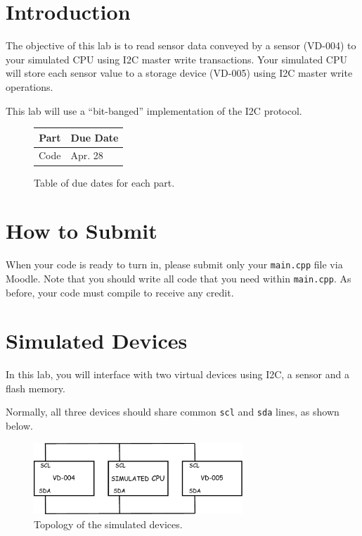 \documentclass{article}
\begin{document}
\section{Introduction}

The objective of this lab is to read sensor data conveyed by a sensor
(VD-004) to your simulated CPU using I2C master write transactions.
Your simulated CPU will store each sensor value to a storage device
(VD-005) using I2C master write operations.

This lab will use a ``bit-banged'' implementation of the I2C protocol.

\begin{figure}[H]

	\centering

	\begin{tabular}{r|l}

		Part & Due Date \\ \hline\hline
		Code & Apr. 28\\

	\end{tabular}

	\caption{Table of due dates for each part.}

\end{figure}

\tableofcontents

\section{How to Submit }

When your code is ready to turn in, please submit only your \texttt{main.cpp}
file via Moodle. Note that you should write all code that you need within
\texttt{main.cpp}. As before, your code must compile to receive any credit.

\section{Simulated Devices}

In this lab, you will interface with two virtual devices using I2C, a sensor
and a flash memory.

Normally, all three devices should share common \texttt{scl} and \texttt{sda}
lines, as shown below.

\begin{figure}[H]
	\centering
       \includegraphics[max width = 0.7\textwidth]{i2c_base.pdf}
	\caption{Topology of the simulated devices.}
\end{figure}
\end{document}
